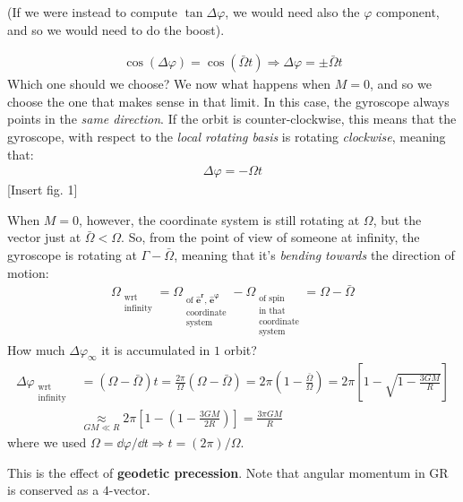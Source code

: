 \documentclass[../template.tex]{subfiles}
\begin{document}
(If we were instead to compute $\tan \Delta \varphi$, we would need also the $\varphi$ component, and so we would need to do the boost).

\begin{align*}
    \cos(\Delta \varphi) = \cos(\bar{\Omega} t) \Rightarrow \Delta \varphi = \pm \bar{\Omega} t 
\end{align*}
Which one should we choose? We now what happens when $M = 0$, and so we choose the one that makes sense in that limit. In this case, the gyroscope always points in the \textit{same direction}. If the orbit is counter-clockwise, this means that the gyroscope, with respect to the \textit{local rotating basis} is rotating \textit{clockwise}, meaning that:
\begin{align*}
    \Delta \varphi =  - \Omega t
\end{align*}   
[Insert fig. 1]

When $M=0$, however, the coordinate system is still rotating at $\Omega$, but the vector just at $\bar{\Omega} < \Omega$. So, from the point of view of someone at infinity, the gyroscope is rotating at $\Gamma - \bar{\Omega}$, meaning that it's \textit{bending} \textit{towards} the direction of motion:
\begin{align*}
    \Omega_{\substack{\text{wrt}\\\text{infinity}}} = 
    \Omega_{\substack{\text{of $\bm{\hat{e}^r}$, $\bm{\hat{e}^\varphi}$ }\\\text{coordinate}\\\text{system} }} -
    \Omega_{\substack{\text{of spin}\\\text{in that}\\\text{coordinate}\\\text{system}}} = \Omega - \bar{\Omega}
\end{align*}      
How much $\Delta \varphi_\infty$ it is accumulated in $1$ orbit?
\begin{align*}
    \Delta \varphi_{\substack{\text{wrt}\\\text{infinity}}} &= (\Omega - \bar{\Omega})t = \frac{2\pi}{\Omega} (\Omega - \bar{\Omega}) = 2\pi \left(1-\frac{\bar{\Omega}}{\Omega} \right)  = 2\pi \left[1-\sqrt{{1-\frac{3GM}{R} } }\right]\\
    &\underset{GM \ll R}{\approx} 2 \pi \left[1-\left(1-\frac{3GM}{2R} \right)\right] = \frac{3 \pi GM}{R} 
\end{align*}  
where we used $\Omega = \dd{\varphi}/\dd{t} \Rightarrow t = (2\pi)/\Omega$.

This is the effect of \textbf{geodetic precession}. Note that angular momentum in GR is conserved as a $4$-vector.
\end{document}
